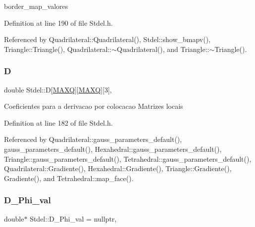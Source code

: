 border\+\_\+map\+\_\+valores 



Definition at line 190 of file Stdel.\+h.



Referenced by Quadrilateral\+::\+Quadrilateral(), Stdel\+::show\+\_\+bmapv(), Triangle\+::\+Triangle(), Quadrilateral\+::$\sim$\+Quadrilateral(), and Triangle\+::$\sim$\+Triangle().

\mbox{\label{classStdel_a61f02fa483b00cb98ff5c8d951068211}} 
\subsubsection{\texorpdfstring{D}{D}}
{\footnotesize\ttfamily double Stdel\+::D\mbox{[}\hyperlink{MyOptions_8h_af708e94d886ba3f59582612949cac702}{M\+A\+XQ}\mbox{]}\mbox{[}\hyperlink{MyOptions_8h_af708e94d886ba3f59582612949cac702}{M\+A\+XQ}\mbox{]}\mbox{[}3\mbox{]}\hspace{0.3cm}{\ttfamily [protected]}, {\ttfamily [inherited]}}

Coeficientes para a derivacao por colocacao Matrizes locais 

Definition at line 182 of file Stdel.\+h.



Referenced by Quadrilateral\+::gauss\+\_\+parameters\+\_\+default(), gauss\+\_\+parameters\+\_\+default(), Hexahedral\+::gauss\+\_\+parameters\+\_\+default(), Triangle\+::gauss\+\_\+parameters\+\_\+default(), Tetrahedral\+::gauss\+\_\+parameters\+\_\+default(), Quadrilateral\+::\+Gradiente(), Hexahedral\+::\+Gradiente(), Triangle\+::\+Gradiente(), Gradiente(), and Tetrahedral\+::map\+\_\+face().

\mbox{\label{classStdel_a80a6c89c61bfef1160257e97b3ffb0a2}} 
\subsubsection{\texorpdfstring{D\+\_\+\+Phi\+\_\+val}{D\_Phi\_val}}
{\footnotesize\ttfamily double$\ast$ Stdel\+::\+D\+\_\+\+Phi\+\_\+val = nullptr\hspace{0.3cm}{\ttfamily [protected]}, {\ttfamily [inherited]}}



